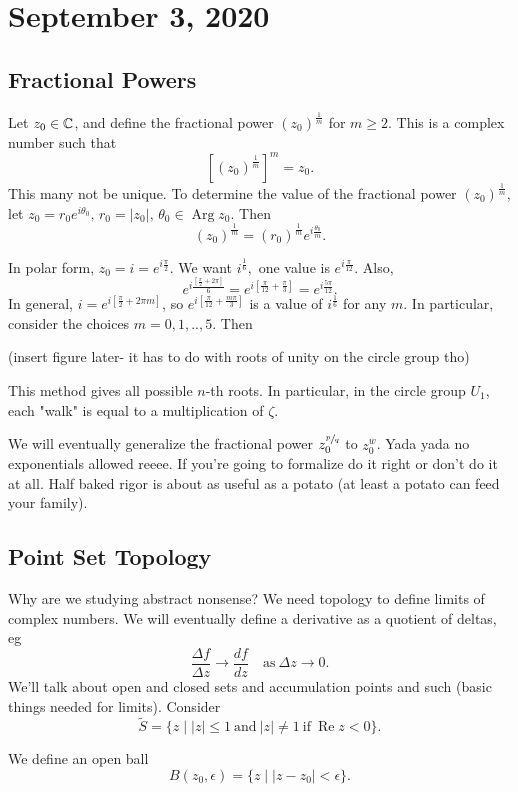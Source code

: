 \section{September 3, 2020}
\subsection{Fractional Powers}
Let $z_0\in \mathbb{C}$, and define the fractional power $(z_0)^{\frac{1}{m}}$ for $m\geq 2$. This is a complex number such that 
\[
    \left[ (z_0)^{\frac{1}{m}} \right]^{m}=z_0.
\]
This many not be unique. To determine the value of the fractional power $(z_0)^{\frac{1}{m}}$, let $z_0=r_0e^{i\theta_0}, \, r_0=|z_0|, \, \theta_0\in \operatorname{Arg} z_0$. Then \[
    (z_0)^{\frac{1}{m}}=(r_0)^{\frac{1}{m}}e^{i\frac{\theta_0}{m}}.
\]
\begin{example}
   In polar form, $z_0=i=e^{i \frac{\pi}{2}}$. We want $i^{\frac{1}{6}},$ one value is $e^{i \frac{\pi}{12}}$. Also, 
   \[
   e^{i \frac{\left[ \frac{\pi}{2}+2\pi \right] }{6}}=e^{i\left[ \frac{\pi}{12}+\frac{\pi}{3} \right] }=e^{i \frac{5\pi}{12}}.
   \]
   In general, $i=e^{i \left[ \frac{\pi}{2}+2\pi m\right] }$, so $e^{i \left[ \frac{\pi}{12}+ \frac{m\pi}{3} \right] }$ is a value of $i^{\frac{1}{6}}$ for any $m$. In particular, consider the choices $m=0,1,..,5$. Then 

   (insert figure later- it has to do with roots of unity on the circle group tho)

   This method gives all possible $n$-th roots. In particular, in the circle group $U_1$, each "walk" is equal to a multiplication of $\zeta$.
\end{example}
We will eventually generalize the fractional power $z_0^{\sfrac{p}{q}}$ to $z_0^{w}$. Yada yada no exponentials allowed reeee. If you're going to formalize do it right or don't do it at all. Half baked rigor is about as useful as a potato (at least a potato can feed your family).

\subsection{Point Set Topology}
Why are we studying abstract nonsense? We need topology to define limits of complex numbers. We will eventually define a derivative as a quotient of deltas, eg \[
    \frac{\Delta f}{\Delta z} \to \frac{df}{dz} \quad \text{as} \ \Delta z \to 0.
\]
We'll talk about open and closed sets and accumulation points and such (basic things needed for limits). Consider \[
    \widetilde{S}= \{z  \mid |z| \leq 1 \ \text{and} \ |z| \neq 1 \ \text{if} \ \operatorname{Re} z < 0\}. 
\]
\begin{definition}
    We define an open ball \[
        B(z_0, \epsilon) = \{z \mid |z-z_0|<\epsilon\}.
    \]
\end{definition}

